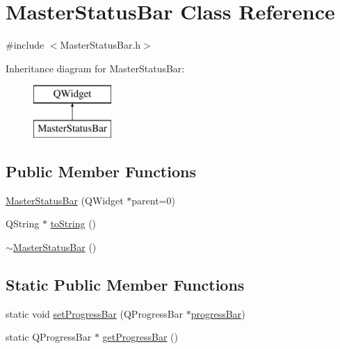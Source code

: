 \hypertarget{class_master_status_bar}{\section{Master\-Status\-Bar Class Reference}
\label{class_master_status_bar}
}


{\ttfamily \#include $<$Master\-Status\-Bar.\-h$>$}

Inheritance diagram for Master\-Status\-Bar\-:\begin{figure}[H]
\begin{center}
\leavevmode
\includegraphics[height=2.000000cm]{class_master_status_bar}
\end{center}
\end{figure}
\subsection*{Public Member Functions}
\begin{DoxyCompactItemize}
\item 
\hyperlink{class_master_status_bar_a270ff318349e8c90cfebe183e00cd14f}{Master\-Status\-Bar} (Q\-Widget $\ast$parent=0)
\item 
Q\-String $\ast$ \hyperlink{class_master_status_bar_a76f1b2c2d798c9afced4938c94aeee55}{to\-String} ()
\item 
\hyperlink{class_master_status_bar_ab6c1c48a1481006d73cf1c0de2eb4047}{$\sim$\-Master\-Status\-Bar} ()
\end{DoxyCompactItemize}
\subsection*{Static Public Member Functions}
\begin{DoxyCompactItemize}
\item 
static void \hyperlink{class_master_status_bar_a35e5194c829d660ac843ad915027f3b9}{set\-Progress\-Bar} (Q\-Progress\-Bar $\ast$\hyperlink{class_master_status_bar_a3e6e1fbd09ecda5a40bf8ea7e8ca62b5}{progress\-Bar})
\item 
static Q\-Progress\-Bar $\ast$ \hyperlink{class_master_status_bar_a42f5451c20265b6f67c018bea595b304}{get\-Progress\-Bar} ()
\end{DoxyCompactItemize}
